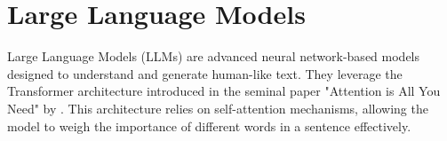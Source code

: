             
            
            
    
    \section{Large Language Models}         

        Large Language Models (LLMs) are advanced neural network-based models designed to understand and generate human-like text. They leverage the Transformer architecture introduced in the seminal paper "Attention is All You Need" by \cite{Vaswani2017}. This architecture relies on self-attention mechanisms, allowing the model to weigh the importance of different words in a sentence effectively. 

